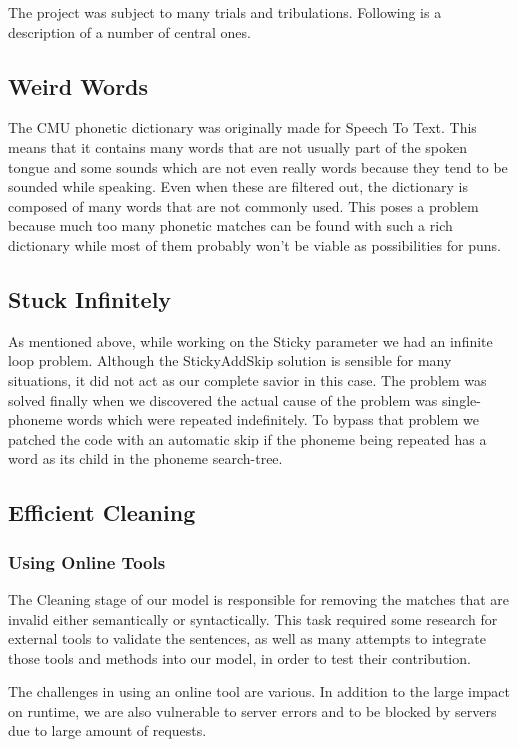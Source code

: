 \documentclass[11pt,a4paper]{article}
\begin{document}
The project was subject to many trials and tribulations. Following is a description of a number of central ones. 

\subsection{Weird Words}
The CMU phonetic dictionary was originally made for Speech To Text. This means that it contains many words that are not usually part of the spoken tongue and some sounds which are not even really words because they tend to be sounded while speaking. Even when these are filtered out, the dictionary is composed of many words that are not commonly used. This poses a problem because much too many phonetic matches can be found with such a rich dictionary while most of them probably won't be viable as possibilities for puns.

\subsection{Stuck Infinitely}
As mentioned above, while working on the Sticky parameter we had an infinite loop problem. Although the StickyAddSkip solution is sensible for many situations, it did not act as our complete savior in this case. The problem was solved finally when we discovered the actual cause of the problem was single-phoneme words which were repeated indefinitely. To bypass that problem we patched the code with an automatic skip if the phoneme being repeated has a word as its child in the phoneme search-tree.

\subsection{Efficient Cleaning}
\subsubsection{Using Online Tools}

The Cleaning stage of our model is responsible for removing the matches that are invalid either semantically or syntactically. This task required some research for external tools to validate the sentences, as well as many attempts to integrate those tools and methods into our model, in order to test their contribution. 

The challenges in using an online tool are various. In addition to the large impact on runtime, we are also vulnerable to server errors and to be blocked by servers due to large amount of requests. 
\end{document}
